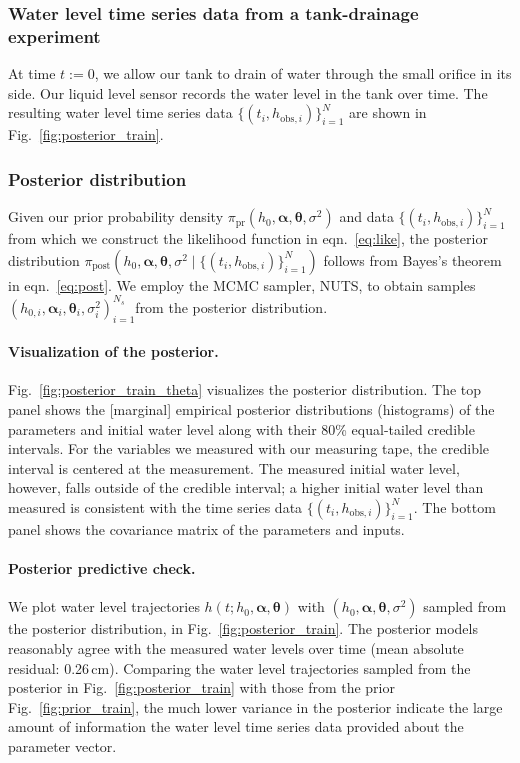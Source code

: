 \documentclass[openacc]{rsproca_new}%
\newcommand\thedata {$\{(t_i,h_{\text{obs}, i})\}_{i=1}^{N}$\xspace}
\newcommand\thedatanomath {\{(t_i,h_{\text{obs}, i})\}_{i=1}^{N}}
\newcommand\themodel {$h(t; h_0, \boldsymbol \alpha, \boldsymbol\theta)$\xspace}
\newcommand\thevars{h_0, \boldsymbol \alpha, \boldsymbol \theta, \sigma^2}
\newcommand\thesamples{$(h_{0, i}, \boldsymbol \alpha_i, \boldsymbol \theta_i, \sigma_i^2)_{i=1}^{N_s}$}
\begin{document}
\subsubsection{Water level time series data from a tank-drainage experiment} At time $t:=0$, we allow our tank to drain of water through the small orifice in its side. Our liquid level sensor records the water level in the tank over time. The resulting water level time series data \thedata are shown in Fig.~\ref{fig:posterior_train}.

\subsubsection{Posterior distribution}
Given our prior probability density $\pi_{\text{pr}}(h_0, \boldsymbol \alpha, \boldsymbol \theta, \sigma^2)$ and data \thedata from which we construct the likelihood function in eqn.~\ref{eq:like}, the posterior distribution $\pi_{\text{post}}(h_0, \boldsymbol \alpha, \boldsymbol \theta, \sigma^2 \mid \thedatanomath)$ follows from Bayes's theorem in eqn.~\ref{eq:post}. 
We employ the MCMC sampler, NUTS, to obtain samples \thesamples from the posterior distribution. 


\paragraph{Visualization of the posterior.}Fig.~\ref{fig:posterior_train_theta} visualizes the posterior distribution. 
The top panel shows the [marginal] empirical posterior distributions (histograms) of the parameters and initial water level along with their 80\% equal-tailed credible intervals. 
For the variables we measured with our measuring tape, the credible interval is centered at the measurement. 
The measured initial water level, however, falls outside of the credible interval; a higher initial water level than measured is consistent with the time series data \thedata.
The bottom panel shows the covariance matrix of the parameters and inputs. 


\paragraph{Posterior predictive check.} We plot water level trajectories \themodel with $(\thevars)$ sampled from the posterior distribution, in Fig.~\ref{fig:posterior_train}. 
The posterior models reasonably agree with the measured water levels over time (mean absolute residual: 0.26\,cm). 
Comparing the water level trajectories sampled from the posterior in Fig.~\ref{fig:posterior_train} with those from the prior Fig.~\ref{fig:prior_train}, the much lower variance in the posterior indicate the large amount of information the water level time series data provided about the parameter vector.
\end{document}
